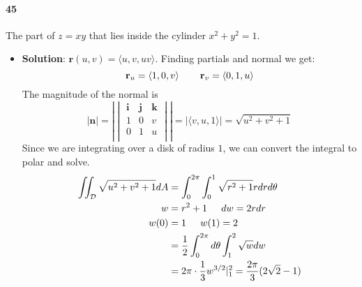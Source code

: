 \documentclass{article}
\begin{document}
    \paragraph{45} The part of $z=xy$ that lies inside the cylinder $x^2+y^2=1$.
    \begin{itemize}
        \item \textbf{Solution}: $\mathbf{r}(u,v)=\langle u,v, uv \rangle$. Finding partials and normal we get:
        \[ \mathbf{r}_u = \langle 1, 0, v\rangle \hspace{0.3in} \mathbf{r}_v = \langle 0, 1, u \rangle \]
        The magnitude of the normal is
        \[  
            |\mathbf{n}| = |\begin{vmatrix}
                \mathbf{i} & \mathbf{j} & \mathbf{k}\\
                1 & 0 & v\\
                0 & 1 & u\\
            \end{vmatrix}| = |\langle v, u, 1 \rangle | = \sqrt{u^2 + v^2 + 1}
        \]
        Since we are integrating over a disk of radius $1$, we can convert the integral to polar and solve.
        \begin{align*}
            \iint_{\mathcal{D}} \sqrt{u^2+v^2+1}dA &= \int_0^{2\pi} \int_0^1 \sqrt{r^2+1}rdrd\theta\\
            w &= r^2 + 1 \hspace{0.2in} dw = 2rdr \\
            w(0) &= 1 \hspace{0.2in} w(1) = 2\\
            &= \frac{1}{2}\int_0^{2\pi}d\theta \int_1^2 \sqrt{w}dw \\
            &= 2\pi\cdot \frac{1}{3}w^{3/2}|_1^2 = \frac{2\pi}{3}(2\sqrt{2}-1)
        \end{align*}
    \end{itemize}
    
\end{document}

